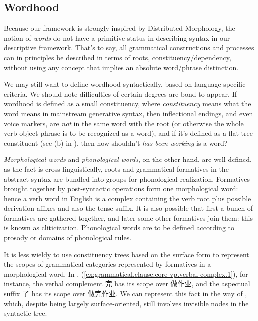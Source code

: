 \documentclass[UTF8, a4paper, oneside, scheme=plain, 12pt]{ctexrep}
\newcommand*{\term}[1]{\emph{#1}}
\newcommand{\form}[1]{\emph{#1}}
\begin{document}
{\subsection{Wordhood}\label{sec:intro.theory.word}

Because our framework is strongly inspired by Distributed Morphology,
the notion of \term{words} do not have a primitive status
in describing syntax in our descriptive framework.
That's to say, all grammatical constructions and processes
can in principles be described in terms of roots, constituency/dependency,
without using any concept that implies an absolute word/phrase distinction.

We may still want to define wordhood syntactically,
based on language-specific criteria.
We should note difficulties of certain degrees are bond to appear.
If wordhood is defined as a small constituency, where \term{constituency} means what the word means in mainstream generative syntax,
then inflectional endings, and even voice markers,
are \emph{not} in the same word with the root
(or otherwise the whole verb-object phrase is to be recognized as a word),
and if it's defined as a flat-tree constituent (see (b) in ),
then how shouldn't \form{has been working} is a word?

\emph{Morphological words} and \emph{phonological words},
on the other hand, are well-defined, as the fact is cross-linguistically,
roots and grammatical formatives in the abstract syntax are bundled into groups for phonological realization.
Formatives brought together by post-syntactic operations form one morphological word:
hence a verb word in English is a complex containing
the verb root plus possible derivation affixes and also the tense suffix.
It is also possible that first a bunch of formatives are gathered together,
and later some other formatives join them:
this is known as cliticization.
Phonological words are to be defined according to prosody
or domains of phonological rules.

It is less wieldy to use constituency trees based on the surface form to represent 
the scopes of grammatical categories represented by formatives
in a morphological word.
In , (\ref{ex:grammatical.clause.core-vp.verbal-complex.1}),
for instance, the verbal complement 完 has its scope over 做作业,
and the aspectual suffix 了 has its scope over 做完作业.
We can represent this fact in the way of ,
which, despite being largely surface-oriented, still involves invisible nodes in the syntactic tree. 

}
\end{document}
